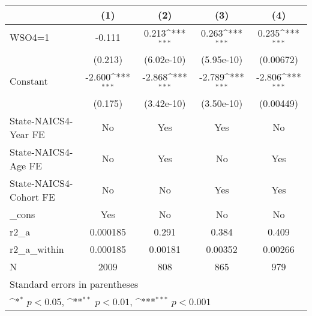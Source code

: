 {
\def\sym#1{\ifmmode^{#1}\else\(^{#1}\)\fi}
\begin{tabular}{l*{4}{c}}
\hline\hline
                    &\multicolumn{1}{c}{(1)}         &\multicolumn{1}{c}{(2)}         &\multicolumn{1}{c}{(3)}         &\multicolumn{1}{c}{(4)}         \\
\hline
WSO4=1              &      -0.111         &       0.213\sym{***}&       0.263\sym{***}&       0.235\sym{***}\\
                    &     (0.213)         &  (6.02e-10)         &  (5.95e-10)         &   (0.00672)         \\
[1em]
Constant            &      -2.600\sym{***}&      -2.868\sym{***}&      -2.789\sym{***}&      -2.806\sym{***}\\
                    &     (0.175)         &  (3.42e-10)         &  (3.50e-10)         &   (0.00449)         \\
[1em]
State-NAICS4-Year FE&          No         &         Yes         &         Yes         &          No         \\
[1em]
State-NAICS4-Age FE &          No         &         Yes         &          No         &         Yes         \\
[1em]
State-NAICS4-Cohort FE&          No         &          No         &         Yes         &         Yes         \\
[1em]
\_cons              &         Yes         &          No         &          No         &          No         \\
\hline
r2\_a                &    0.000185         &       0.291         &       0.384         &       0.409         \\
r2\_a\_within         &    0.000185         &     0.00181         &     0.00352         &     0.00266         \\
N                   &        2009         &         808         &         865         &         979         \\
\hline\hline
\multicolumn{5}{l}{\footnotesize Standard errors in parentheses}\\
\multicolumn{5}{l}{\footnotesize \sym{*} \(p<0.05\), \sym{**} \(p<0.01\), \sym{***} \(p<0.001\)}\\
\end{tabular}
}
